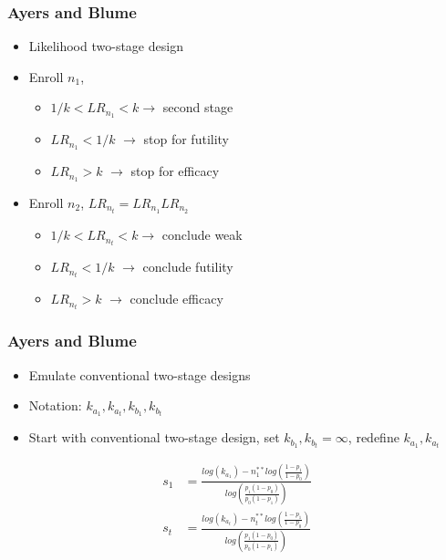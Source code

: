 \documentclass{beamer}\usepackage[]{graphicx}\usepackage[]{color}
\begin{document}
\begin{frame}
\frametitle{Ayers and Blume}
    \begin{itemize}
        \item Likelihood two-stage design
        \item Enroll $n_1$, 
        \begin{itemize}
           \item $1/k < LR_{n_1} < k \rightarrow$ second stage
           \item $LR_{n_1} < 1/k$ $\rightarrow$ stop for futility
           \item $LR_{n_1} > k$ $\rightarrow$ stop for efficacy
        \end{itemize}
        \item Enroll $n_2$, $LR_{n_t}=LR_{n_1}LR_{n_2}$
        \begin{itemize}
           \item $1/k < LR_{n_t} < k \rightarrow$ conclude weak
           \item $LR_{n_t} < 1/k$ $\rightarrow$ conclude futility
           \item $LR_{n_t} > k$ $\rightarrow$ conclude efficacy
        \end{itemize}
    \end{itemize}
\end{frame}

\begin{frame}
\frametitle{Ayers and Blume}
    \begin{itemize}
        \item Emulate conventional two-stage designs %
        \item Notation: $k_{a_1}, k_{a_t}, k_{b_1}, k_{b_t}$
        \item Start with conventional two-stage design, set $k_{b_1}, k_{b_t} = \infty$, redefine $k_{a_1}, k_{a_t}$
    \end{itemize}
\begin{equation}
\begin{aligned}
s_1 &= \frac{log(k_{a_1}) - n_1^{\ast\ast} log\left(\frac{1-p_1}{1-p_0}\right)}{log\left(\frac{p_1(1-p_0)}{p_0(1-p_1)}\right)} \\
s_t &= \frac{log(k_{a_t}) - n_t^{\ast\ast} log\left(\frac{1-p_1}{1-p_0}\right)}{log\left(\frac{p_1(1-p_0)}{p_0(1-p_1)}\right)}
\end{aligned}
\end{equation}
\end{frame}
\end{document}
